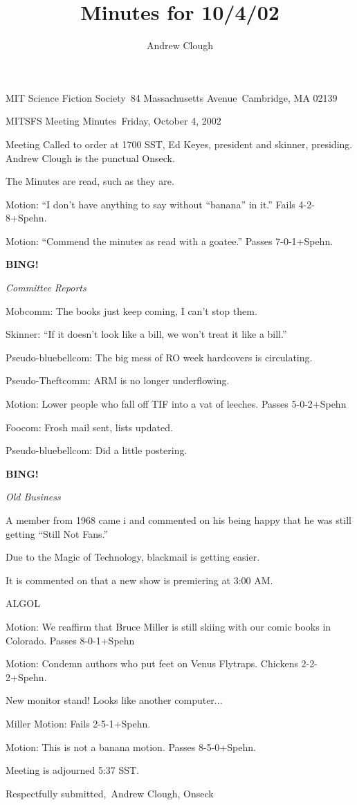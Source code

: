 \documentclass{article}
\title{Minutes for 10/4/02}
\author{Andrew Clough}
\begin{document}
\begin{center}
MIT Science Fiction Society\
84 Massachusetts Avenue\
Cambridge, MA 02139\
\end{center}

\begin{center}
MITSFS Meeting Minutes\
Friday, October 4, 2002\
\end{center}

Meeting Called to order at 1700 SST, Ed Keyes, president and skinner, presiding.  Andrew Clough is the punctual Onseck.\

The Minutes are read, such as they are.\

Motion: ``I don't have anything to say without ``banana'' in it.'' Fails 4-2-8+Spehn.\

Motion:  ``Commend the minutes as read with a goatee.''  Passes 7-0-1+Spehn.\

\textbf{BING!}
\begin{center}
\textit{Committee Reports}
\end{center}

Mobcomm:  The books just keep coming, I can't stop them.\

Skinner:  ``If it doesn't look like a bill, we won't treat it like a bill.''\

Pseudo-bluebellcom:  The big mess of RO week hardcovers is circulating.\

Pseudo-Theftcomm:  ARM is no longer underflowing.\

Motion:  Lower people who fall off TIF into a vat of leeches.  Passes 5-0-2+Spehn\

Foocom:  Frosh mail sent, lists updated.\

Pseudo-bluebellcom:  Did a little postering.\

\textbf{BING!}
\begin{center}
\textit{Old Business}
\end{center}

A member from 1968 came i and commented on his being happy that he was still getting ``Still Not Fans.''\

Due to the Magic of Technology, blackmail is getting easier.\

It is commented on that a new show is premiering at 3:00 AM.\

ALGOL\

Motion:  We reaffirm that Bruce Miller is still skiing with our comic books in Colorado.  Passes 8-0-1+Spehn\

Motion:  Condemn authors who put feet on Venus Flytraps.  Chickens 2-2-2+Spehn.\

New monitor stand!  Looks like another computer...\

Miller Motion: Fails 2-5-1+Spehn.\

Motion:  This is not a banana motion.  Passes 8-5-0+Spehn.\

Meeting is adjourned 5:37 SST.\

\begin{center}
Respectfully submitted,\
Andrew Clough, Onseck\
\end{center}
\end{document}
